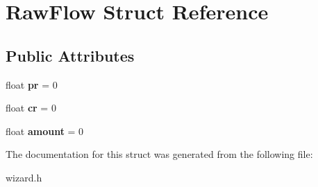 \hypertarget{struct_raw_flow}{}\section{Raw\+Flow Struct Reference}
\label{struct_raw_flow}
\subsection*{Public Attributes}
\begin{DoxyCompactItemize}
\item 
\hypertarget{struct_raw_flow_a8a901b91a653344b5c1aa89b6b7aa146}{}float {\bfseries pr} = 0\label{struct_raw_flow_a8a901b91a653344b5c1aa89b6b7aa146}

\item 
\hypertarget{struct_raw_flow_ab43dc4259f2ce6a0e9767f7f2b2f7fad}{}float {\bfseries cr} = 0\label{struct_raw_flow_ab43dc4259f2ce6a0e9767f7f2b2f7fad}

\item 
\hypertarget{struct_raw_flow_ad3584703c40820da132e3a220182625b}{}float {\bfseries amount} = 0\label{struct_raw_flow_ad3584703c40820da132e3a220182625b}

\end{DoxyCompactItemize}


The documentation for this struct was generated from the following file\+:\begin{DoxyCompactItemize}
\item 
wizard.\+h\end{DoxyCompactItemize}
